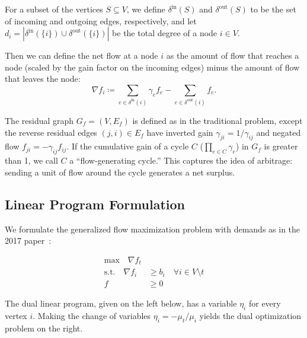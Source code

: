 \documentclass[11pt]{article}
\theoremstyle{definition}
\theoremstyle{definition}
\newcommand{\nfi}{\nabla f_i}
\newcommand{\din}{\delta^{\text{in}}}
\newcommand{\dout}{\delta^{\text{out}}}
\newcommand{\rewrite}[1]{\textcolor{red}{#1}}
\begin{document}
	For a subset of the vertices $S \subseteq V$, we define $\din(S)$ and
	$\dout(S)$ to be the set of incoming and outgoing edges, respectively,
	and let $d_i = |\din(\{i\}) \cup \dout(\{i\})|$ be the total degree of a
	node $i \in V$.

	Then we can define the net flow at a node $i$ as the amount of flow that
	reaches a node (scaled by the gain factor on the incoming edges) minus the
	amount of flow that leaves the node: 
	$$ \nfi \coloneqq \sum_{e \in \din(i)} \gamma_e f_e - \sum_{e \in \dout(i)} f_e.$$

	The residual graph $G_f = (V,E_f)$ is defined as in the traditional problem,
	except the reverse residual edges $(j,i) \in E_f$ have inverted gain 
	$\gamma_{ji} = 1 / \gamma_{ij}$ and negated flow $f_{ji} =
	-\gamma_{ij}f_{ij}$. If the cumulative gain of a cycle $C$ ($\prod_{e \in C} \gamma_e$)
	in $G_f$ is greater than 1, we call $C$ a ``flow-generating cycle.'' 
	This captures the idea of arbitrage: sending a unit of flow around the cycle
	generates a net surplus.





	\subsection{Linear Program Formulation}
	\label{sec:lp}

	We formulate the generalized flow maximization problem with demands as in the 2017
	paper~\cite{Olver2017}:
	\vspace{-0.35cm}
%
%

    \begin{align*}\tag{P}
    \text{max} \quad
    \nabla f_t& \\
    \text{s.t.} \quad
    \nabla f_i &\geq b_i \quad \forall i \in V \setminus t \\
    f &\geq 0
    \end{align*}

	The dual linear program, given on the left below, has a variable $\eta_i$ for
	every vertex $i$. 
	Making the change of variables $\eta_i = - \mu_t / \mu_i$ yields the
	dual optimization problem on the right.
    \vspace{0.5cm}
\end{document}
